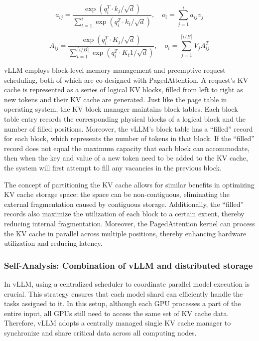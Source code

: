 \documentclass[conference]{IEEEtran}
\begin{document}
\[a_{ij} = \frac{\exp(q_i^{T} \cdot k_j / \sqrt{d})}{\sum_{t=1}^{i} \exp(q_i^{T} \cdot k_t / \sqrt{d})}, \quad o_i = \sum_{j=1}^{i} a_{ij} v_j\]

\[A_{ij} = \frac{\exp(q_i^{T} \cdot K_j / \sqrt{d})}{\sum_{t=1}^{\lceil {i/B} \rceil} \exp(q_i^{T} \cdot K_t1 / \sqrt{d})}, \quad o_i = \sum_{j=1}^{\lceil {i/B} \rceil} V_j A_{ij}^{T}\]

vLLM employs block-level memory management and preemptive request scheduling, both of which are co-designed with PagedAttention. A request’s KV cache is represented as a series of logical KV blocks, filled from left to right as new tokens and their KV cache are generated. Just like the page table in operating system, the KV block manager maintains block tables. Each block table entry records the corresponding physical blocks of a logical block and the number of filled positions. Moreover, the vLLM’s block table has a “filled” record for each block, which represents the number of tokens in that block. If the “filled” record does not equal the maximum capacity that each block can accommodate, then when the key and value of a new token need to be added to the KV cache, the system will first attempt to fill any vacancies in the previous block.

The concept of partitioning the KV cache allows for similar benefits in optimizing KV cache storage space: the space can be non-contiguous, eliminating the external fragmentation caused by contiguous storage. Additionally, the “filled” records also maximize the utilization of each block to a certain extent, thereby reducing internal fragmentation. Moreover, the PagedAttention kernel can process the KV cache in parallel across multiple positions, thereby enhancing hardware utilization and reducing latency.

\subsubsection{Self-Analysis: Combination of vLLM and distributed storage}
In vLLM, using a centralized scheduler to coordinate parallel model execution is crucial. This strategy ensures that each model shard can efficiently handle the tasks assigned to it. In this setup, although each GPU processes a part of the entire input, all GPUs still need to access the same set of KV cache data. Therefore, vLLM adopts a centrally managed single KV cache manager to synchronize and share critical data across all computing nodes.
\end{document}
